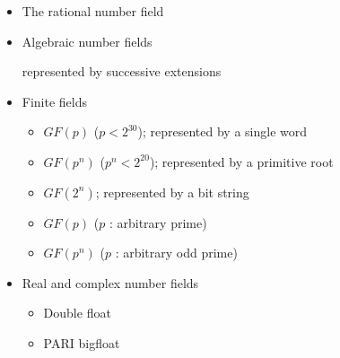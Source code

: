 \documentclass{slides}
\begin{document}
\setlength{\parskip}{10pt}

\begin{slide}{}

\begin{itemize}
\item The rational number field
\item Algebraic number fields

represented by successive extensions
\item Finite fields
\begin{itemize}
\item $GF(p)$ ($p<2^{30}$); represented by a single word
\item $GF(p^n)$ ($p^n < 2^{20}$); represented by a primitive root
\item $GF(2^n)$; represented by a bit string
\item $GF(p)$ ($p$ : arbitrary prime)
\item $GF(p^n)$ ($p$ : arbitrary odd prime)
\end{itemize}

\item Real and complex number fields

\begin{itemize}
\item Double float
\item PARI bigfloat
\end{itemize}

\end{itemize}
\end{slide}
\end{document}
